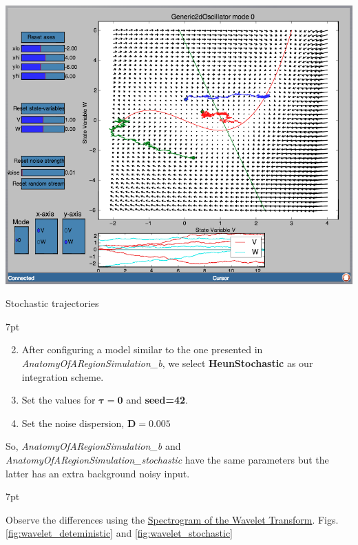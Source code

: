 \documentclass{tufte-handout}
\newenvironment{formal}{%
  \def\FrameCommand{%
    \hspace{1pt}%
    {\color{DarkBlue}\vrule width 2pt}%
    {\color{formalshade}\vrule width 4pt}%
    \colorbox{formalshade}%
  }%
  \MakeFramed{\advance\hsize-\width\FrameRestore}%
  \noindent\hspace{-4.55pt}%
  \begin{adjustwidth}{}{7pt}%
  \vspace{2pt}\vspace{2pt}%
}
{%
  \vspace{2pt}\end{adjustwidth}\endMakeFramed%
}
\newenvironment{simulation}{%
  \def\FrameCommand{%
    \hspace{1pt}%
    {\color{ForestGreen}\vrule width 2pt}%
    {\color{simulationshade}\vrule width 4pt}%
    \colorbox{simulationshade}%
  }%
  \MakeFramed{\advance\hsize-\width\FrameRestore}%
  \noindent\hspace{-4.55pt}%
  \begin{adjustwidth}{}{7pt}%
  \vspace{2pt}\vspace{2pt}%
}
{%
  \vspace{2pt}\end{adjustwidth}\endMakeFramed%
}
\begin{document}
\begin{marginfigure}%
\includegraphics[width=\linewidth]{Handout_UI_BuildingYourOwnBrainNetworkModel_PPI}%
  \caption{Stochastic trajectories}%
  \label{fig:ppi_noise}%
\end{marginfigure}

\begin{simulation}
\begin{enumerate}[resume]
\setcounter{enumi}{1}
\item After configuring a model similar to the one presented in  \textit{AnatomyOfARegionSimulation\_b}, we select \textbf{HeunStochastic} as our integration scheme.  
\item Set the values for {$\boldsymbol{\tau=0}$}  and \textbf{seed=42}. 
\item Set the noise dispersion, $\mathbf{D=0.005}$
\end{enumerate}
\end{simulation}
So, \textit{AnatomyOfARegionSimulation\_b} and \textit{AnatomyOfARegionSimulation\_stochastic} have the same parameters but the latter has an extra background noisy input. 

\begin{formal}
\begin{enumerate}
Observe the differences using the \underline{Spectrogram of the Wavelet Transform}. Figs. \ref{fig:wavelet_deteministic} and \ref{fig:wavelet_stochastic}
\end{enumerate}
\end{formal}
\end{document}
